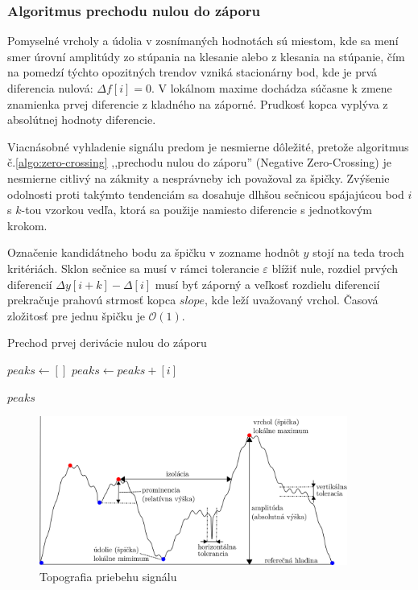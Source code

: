 \subsubsection{Algoritmus prechodu nulou do záporu}
Pomyselné vrcholy a údolia v zosnímaných hodnotách sú miestom, kde sa mení smer úrovní amplitúdy zo stúpania na klesanie alebo
z klesania na stúpanie, čím na pomedzí týchto opozitných trendov vzniká stacionárny bod, kde je prvá diferencia nulová: 
$\Delta f[i] = 0$. V lokálnom maxime dochádza súčasne k zmene znamienka prvej diferencie z kladného na záporné. Prudkosť
kopca vyplýva z absolútnej hodnoty diferencie. 

Viacnásobné vyhladenie signálu predom je nesmierne dôležité, 
pretože algoritmus č.\ref{algo:zero-crossing} ,,prechodu nulou do záporu'' (Negative Zero-Crossing) je nesmierne citlivý
na zákmity a nesprávneby ich považoval za špičky. Zvýšenie odolnosti proti takýmto tendenciám sa dosahuje dlhšou sečnicou
spájajúcou bod $i$ s $k$-tou vzorkou vedľa, ktorá sa použije namiesto diferencie s jednotkovým krokom.

Označenie kandidátneho bodu za špičku v zozname hodnôt $y$ stojí na teda troch kritériách. Sklon sečnice sa musí v 
rámci tolerancie $\varepsilon$ blížiť nule, rozdiel prvých diferencií $\Delta y[i+k] - \Delta[i]$ musí byť záporný a veľkosť 
rozdielu diferencií prekračuje prahovú strmosť kopca $slope$, kde leží uvažovaný vrchol. Časová zložitosť
pre jednu špičku je $\mathcal{O}(1)$. 

\begin{algorithm}[h]
\caption{Prechod prvej derivácie nulou do záporu}
\begin{algorithmic}[1]
	\State $peaks \gets []$
		    \State $peaks \gets peaks + [i]$
		
		\EndIf
	\EndFor
	\State \Return $peaks$
\EndFunction
\end{algorithmic}
\label{algo:zero-crossing}
\end{algorithm}

\begin{figure}[h]
    \centering
    \includegraphics[width=0.9\textwidth]{figures/topography.png}
    \caption{Topografia priebehu signálu}
    \label{fig:topography}
\end{figure}

